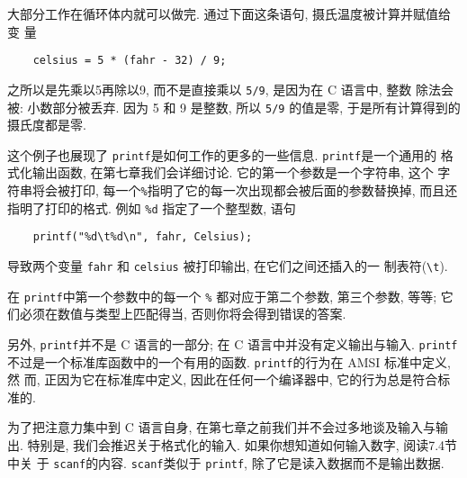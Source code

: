 \documentclass[nofonts, a4paper, oneside, 10pt]{ctexbook}
\newcommand\cemph[1]{{\small{\CJKfamily{kai}{#1}}}}
\newcommand\printf{{\texttt{printf}}}
\newcommand\scanf{{\texttt{scanf}}}
\numberwithin{exercnt}{chapter}
\begin{document}
大部分工作在循环体内就可以做完. 通过下面这条语句, 摄氏温度被计算并赋值给变
量
\begin{verbatim}
    celsius = 5 * (fahr - 32) / 9;
\end{verbatim}
之所以是先乘以5再除以9, 而不是直接乘以 \verb"5/9", 是因为在 C 语言中, 整数
除法会被\cemph{截断}: 小数部分被丢弃. 因为 5 和 9 是整数, 所以 \verb"5/9"
的值是零, 于是所有计算得到的摄氏度都是零.

这个例子也展现了 \printf 是如何工作的更多的一些信息. \printf 是一个通用的
格式化输出函数, 在第七章我们会详细讨论. 它的第一个参数是一个字符串, 这个 
字符串将会被打印, 每一个\verb"%"指明了它的每一次出现都会被后面的参数替换掉,
而且还指明了打印的格式. 例如 \verb"%d" 指定了一个整型数, 语句
\begin{verbatim}
    printf("%d\t%d\n", fahr, Celsius);
\end{verbatim}
导致两个变量 \verb"fahr" 和 \verb"celsius" 被打印输出, 在它们之间还插入的一
制表符(\verb"\t").

在 \printf 中第一个参数中的每一个 \verb"%" 都对应于第二个参数, 第三个参数, 
等等; 它们必须在数值与类型上匹配得当, 否则你将会得到错误的答案.

另外, \printf 并不是 C 语言的一部分; 在 C 语言中并没有定义输出与输入. \printf
不过是一个标准库函数中的一个有用的函数. \printf 的行为在 AMSI 标准中定义, 然
而, 正因为它在标准库中定义, 因此在任何一个编译器中, 它的行为总是符合标准的.

为了把注意力集中到 C 语言自身, 在第七章之前我们并不会过多地谈及输入与输出. 
特别是, 我们会推迟关于格式化的输入. 如果你想知道如何输入数字, 阅读7.4节中关
于 \scanf 的内容. \scanf 类似于 \printf, 除了它是读入数据而不是输出数据.
\end{document}

